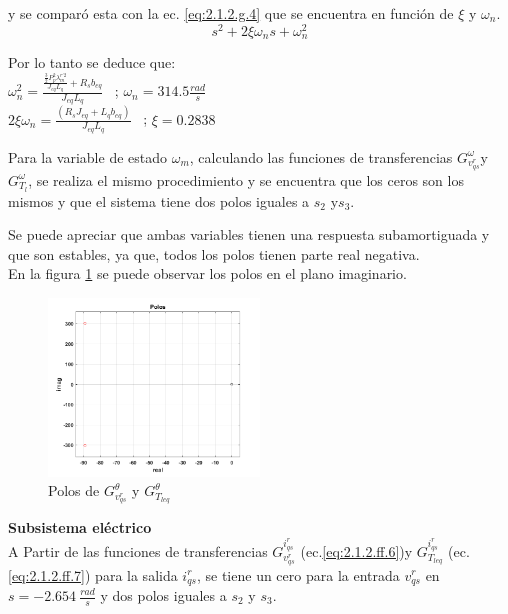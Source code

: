 \documentclass[10pt]{article}
\begin{document}
\begin{itemize}
y se comparó esta con la ec. \ref{eq:2.1.2.g.4} que se encuentra en función de $\xi$ y $\omega_{n}$.
	\begin{equation}
	s^{2}+2\xi \omega_{n} s + \omega_{n}^2 
	\label{eq:2.1.2.g.4}
	\end{equation}

Por lo tanto se deduce que:\\
$\omega_{n}^2 =\frac{\frac{ \frac{3}{2}P_{p}^{2}\lambda ^{r'2}_{m}}{J_{eq}L_{q}}+R_{s}b_{eq}}{J_{eq}L_{q}}$ \ ; $\omega_{n}=314.5 \frac{rad}{s}$\\
$2\xi \omega_{n}=\frac{(R_{s}J_{eq}+L_{q}b_{eq})}{J_{eq}L_{q}}$ \ ; $\xi=0.2838$

Para la variable de estado $\omega_{m}$, calculando las funciones de transferencias $G^{\omega}_{v^{r}_{qs}}$y $G^{\omega}_{T_{l}}$, se realiza el mismo procedimiento y se encuentra que los ceros son los mismos y que el sistema tiene dos polos iguales a $s_{2}$ y$s_{3}$.

Se puede apreciar que ambas variables tienen una respuesta subamortiguada y que son estables, ya que, todos los polos tienen parte real negativa.\\
En la figura \ref{fig:polos} se puede observar los polos en el plano imaginario.

	\begin{figure}[h!]
	\centering
	\includegraphics[width=0.5\textwidth]{polos.png}
	\caption{\label{fig:polos}  Polos de $G^{\theta}_{v^{r}_{qs}}$ y $G^{\theta}_{T_{leq}}$}
	\end{figure}

	\vspace{0.2cm}
\subitem \textbf{Subsistema eléctrico}\vspace{0.2cm} \\
A Partir de las funciones de transferencias $G^{i^{r}_{qs}}_{v^{r}_{qs}}$ (ec.\ref{eq:2.1.2.ff.6})y $G^{i^{r}_{qs}}_{T_{leq}}$ (ec.\ref{eq:2.1.2.ff.7}) para la salida $i^{r}_{qs}$, se tiene un cero para la entrada $v^{r}_{qs}$ en $s=-2.654\ \frac{rad}{s}$ y dos polos iguales a $s_{2}$ y $s_{3}$.


\end{itemize}
\end{document}
